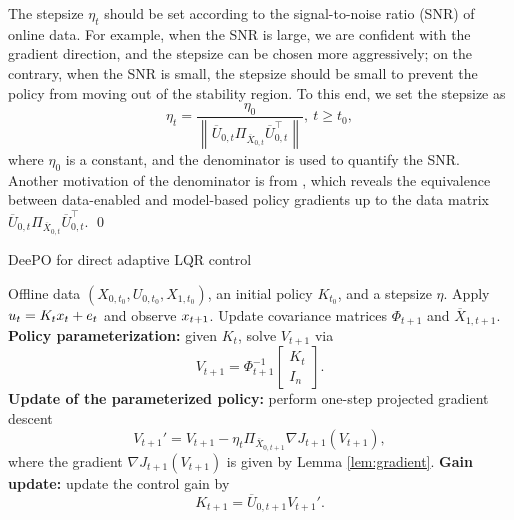 \begin{remark}
    The stepsize $\eta_t$ should be set according to the signal-to-noise ratio (SNR) of online data. For example, when the SNR is large, we are confident with the gradient direction, and the stepsize can be chosen more aggressively; on the contrary, when the SNR is small, the stepsize should be small to prevent the policy from moving out of the stability region. To this end, we set the stepsize as 
    \begin{equation}    
    \eta_t = \frac{\eta_0}{\left\|\overline{U}_{0,t}\Pi_{\overline{X}_{0,t}}\overline{U}_{0,t}^{\top}\right\|}, ~t\geq t_0,
    \end{equation}
    where $\eta_0$ is a constant, and the denominator is used to quantify the SNR. Another motivation of the denominator is from \cite[Lemma 3]{kang2024linear}, which reveals the equivalence between data-enabled and model-based policy gradients up to the data matrix $\overline{U}_{0,t}\Pi_{\overline{X}_{0,t}}\overline{U}_{0,t}^{\top}$. \qed
\end{remark}
 

\begin{algorithm}[t]
	\caption{DeePO for direct adaptive LQR control}
	\label{alg:deepo}
	\begin{algorithmic}[1]
		\Require Offline data $(X_{0,t_0}, U_{0,t_0}, X_{1,t_0})$, an initial policy $K_{t_0}$, and a stepsize $\eta$.
		\State Apply $u_{t} =K_tx_{t}  + e_{t} $ and observe $x_{t+1} $.
        \State Update covariance matrices $\Phi_{t+1}$ and $\overline{X}_{1,t+1}$.
		\State \textbf{Policy parameterization:} given $K_{t}$, solve $V_{t+1}$ via 
		$$
		V_{t+1} =\Phi_{t+1}^{-1} \begin{bmatrix}
		K_{t} \\
		I_n
		\end{bmatrix}.
		$$
		\State \textbf{Update of the parameterized policy:} perform one-step projected gradient descent
		\begin{equation}\label{equ:pro_gd}
		V_{t+1}' = V_{t+1} - \eta_t  \Pi_{\overline{X}_{0,t+1}} \nabla J_{t+1}(V_{t+1}),
		\end{equation} 
		where the gradient $\nabla J_{t+1}(V_{t+1})$ is given by Lemma \ref{lem:gradient}.
		\State \textbf{Gain update:} update the control gain by 
		$$
		K_{t+1} = \overline{U}_{0,t+1}V_{t+1}'.
		$$
		\EndFor	
	\end{algorithmic}
\end{algorithm}

